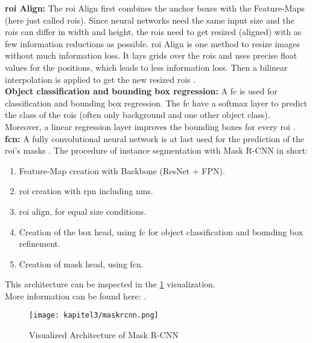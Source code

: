 		\textbf{\ac{roi} Align:} The \ac{roi} Align first combines the anchor boxes with the Feature-Maps (here just called \ac{roi}s). Since neural networks need the same input size and the \ac{roi}s can differ in width and height, the \ac{roi}s need to get resized (aligned) with as few information reductions as possible. \ac{roi} Align is one method to resize images without much information loss. It lays grids over the \ac{roi}s and uses precise float values for the positions, which leads to less information loss. Then a bilinear interpolation is applied to get the new resized \ac{roi}s \cite{Kaiming2017}.\\
		\textbf{Object classification and bounding box regression:} A \ac{fc} is used for classification and bounding box regression. The \ac{fc} have a softmax layer to predict the class of the \ac{roi}s (often only background and one other object class). Moreover, a linear regression layer improves the bounding boxes for every \ac{roi} \cite{Ren2016}.\\
		\textbf{\ac{fcn}:} A fully convolutional neural network is at last used for the prediction of the \ac{roi}'s masks \cite{Kang2014}.
		\newpage
		The procedure of instance segmentation with Mask R-CNN in short:
		\begin{enumerate}
			\item Feature-Map creation with Backbone (ResNet + FPN).
			\item \ac{roi} creation with \ac{rpn} including \ac{nms}.
			\item \ac{roi} align, for equal size conditions.
			\item Creation of the box head, using \ac{fc} for object classification and bounding box refinement.
			\item Creation of mask head, using \ac{fcn}.
		\end{enumerate}
		This architecture can be inspected in the \ref{img:maskrcnn} visualization.\\
		More information can be found here: \cite{Kaiming2017}\cite{Ramesh2021}. 
		
		\begin{figure}[h]
			\centering
			\texttt{[image: kapitel3/maskrcnn.png]}
			\caption[Visualized Architecture of Mask R-CNN by Tobia Ippolito]{Visualized Architecture of Mask R-CNN}
			\label{img:maskrcnn}
		\end{figure}
		

